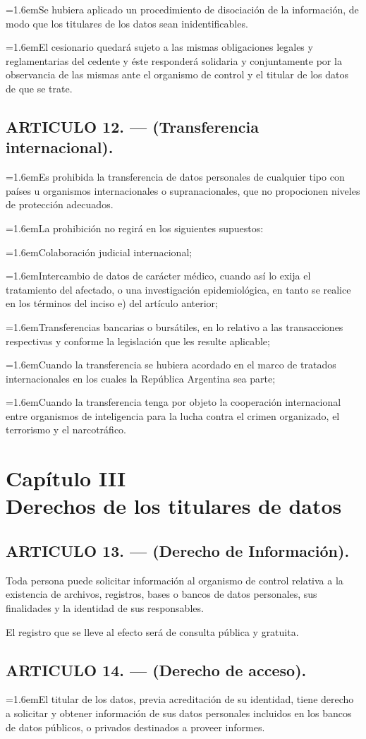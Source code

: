 \documentclass[10pt,a4paper]{article}
\newcommand{\capitulo}[2]{\section[#1 --- #2]{#1\\[2pt]#2}}
\newcommand{\articulo}[1]{\subsection{#1}}
\newcommand{\inciso}[2]{\par{\hangindent=1.6em\hangafter=1\makebox[1.6em][l]{#1}#2\par}}
\begin{document}
\inciso{e)}{Se hubiera aplicado un procedimiento de disociación de la información, de modo que los titulares de los datos sean inidentificables.}

\inciso{4.}{El cesionario quedará sujeto a las mismas obligaciones legales y reglamentarias del cedente y éste responderá solidaria y conjuntamente por la observancia de las mismas ante el organismo de control y el titular de los datos de que se trate.}

\articulo{ARTICULO 12. — (Transferencia internacional).}
\inciso{1.}{Es prohibida la transferencia de datos personales de cualquier tipo con países u organismos internacionales o supranacionales, que no propocionen niveles de protección adecuados.}

\inciso{2.}{La prohibición no regirá en los siguientes supuestos:}

\inciso{a)}{Colaboración judicial internacional;}

\inciso{b)}{Intercambio de datos de carácter médico, cuando así lo exija el tratamiento del afectado, o una investigación epidemiológica, en tanto se realice en los términos del inciso e) del artículo anterior;}

\inciso{c)}{Transferencias bancarias o bursátiles, en lo relativo a las transacciones respectivas y conforme la legislación que les resulte aplicable;}

\inciso{d)}{Cuando la transferencia se hubiera acordado en el marco de tratados internacionales en los cuales la República Argentina sea parte;}

\inciso{e)}{Cuando la transferencia tenga por objeto la cooperación internacional entre organismos de inteligencia para la lucha contra el crimen organizado, el terrorismo y el narcotráfico.}

\capitulo{Capítulo III}{Derechos de los titulares de datos}
\articulo{ARTICULO 13. — (Derecho de Información).}
Toda persona puede solicitar información al organismo de control relativa a la existencia de archivos, registros, bases o bancos de datos personales, sus finalidades y la identidad de sus responsables.

El registro que se lleve al efecto será de consulta pública y gratuita.

\articulo{ARTICULO 14. — (Derecho de acceso).}
\inciso{1.}{El titular de los datos, previa acreditación de su identidad, tiene derecho a solicitar y obtener información de sus datos personales incluidos en los bancos de datos públicos, o privados destinados a proveer informes.}
\end{document}
